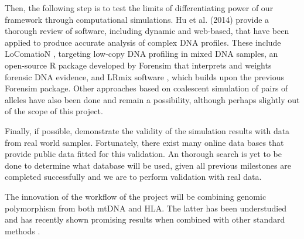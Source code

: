 \documentclass[10pt]{article}
\begin{document}
Then, the following step is to test the limits of differentiating power of our framework through computational simulations. Hu et al. (2014) \cite{Hu2014} provide a thorough review of software, including dynamic and web-based, that have been applied to produce accurate analysis of complex DNA profiles. These include LoComatioN \cite{Gill2007}, targeting low-copy DNA profiling in mixed DNA samples, an open-source R package developed by Forensim \cite{Haned2011forensim} that interprets and weights forensic DNA evidence, and LRmix software \cite{Haned2011analysis}, which builds upon the previous Forensim package. Other approaches based on coalescent simulation of pairs of alleles have also been done and remain a possibility, although perhaps slightly out of the scope of this project.

Finally, if possible, demonstrate the validity of the simulation results with data from real world samples. Fortunately, there exist many online data bases that provide public data fitted for this validation. An thorough search is yet to be done to determine what database will be used, given all previous milestones are completed successfully and we are to perform validation with real data.

The innovation of the workflow of the project will be combining genomic polymorphism from both mtDNA and HLA. The latter has been understudied and has recently shown promising results when combined with other standard methods \cite{Kuffel2019}. 


\printbibliography
\end{document}
